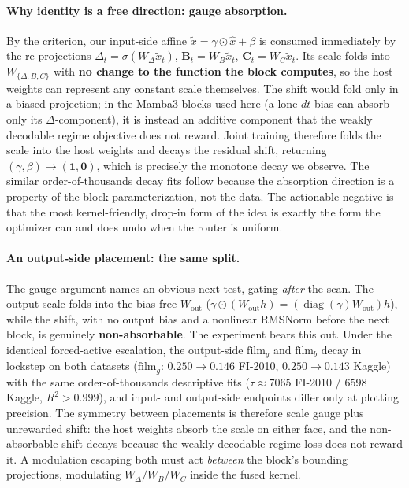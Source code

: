 \documentclass{article}
\DeclareMathOperator{\diagop}{diag}
\newcommand{\diag}{\diagop}
\begin{document}
\paragraph{Why identity is a free direction: gauge absorption.}
By the criterion, our input-side affine $\tilde{x}=\gamma\odot\hat{x}+\beta$ is
consumed immediately by the re-projections $\Delta_t=\sigma(W_\Delta\tilde{x}_t)$,
$\mathbf{B}_t=W_B\tilde{x}_t$, $\mathbf{C}_t=W_C\tilde{x}_t$. Its scale folds into
$W_{\{\Delta,B,C\}}$ with \textbf{no change to the function the block computes}, so
the host weights can represent any constant scale themselves. The shift would fold
only in a biased projection; in the Mamba3 blocks used here (a lone $dt$ bias can
absorb only its $\Delta$-component), it is instead an
additive component that the weakly decodable regime objective does not reward. Joint
training therefore folds the scale into the host weights and decays the residual
shift, returning $(\gamma,\beta)\to(\mathbf{1},\mathbf{0})$, which is precisely the
monotone decay we observe. The similar order-of-thousands decay fits follow because
the absorption direction is a property of the block parameterization, not the data.
The actionable negative is that the most kernel-friendly, drop-in form of the idea
is exactly the form the optimizer can and does undo when the router is uniform.

\paragraph{An output-side placement: the same split.}
The gauge argument names an obvious next test, gating \emph{after} the scan. The
output scale folds into the bias-free $W_{\text{out}}$
($\gamma\odot(W_{\text{out}}h)=(\diag(\gamma)W_{\text{out}})h$), while the shift,
with no output bias and a nonlinear RMSNorm before the next block, is genuinely
\textbf{non-absorbable}. The experiment bears this out. Under the identical
forced-active escalation, the output-side $\mathrm{film}_g$ and $\mathrm{film}_b$
decay in lockstep on both datasets ($\mathrm{film}_g$: $0.250\to0.146$ FI-2010,
$0.250\to0.143$ Kaggle) with the same order-of-thousands descriptive fits
($\tau\approx7065$ FI-2010 / $6598$ Kaggle, $R^2>0.999$), and input- and
output-side endpoints differ only at plotting precision. The symmetry between
placements is therefore scale gauge plus unrewarded shift: the host weights absorb
the scale on either face, and the non-absorbable shift decays because the weakly
decodable regime loss does not reward it. A modulation escaping both must act
\emph{between} the block's bounding projections, modulating $W_\Delta/W_B/W_C$
inside the fused kernel.
\end{document}
